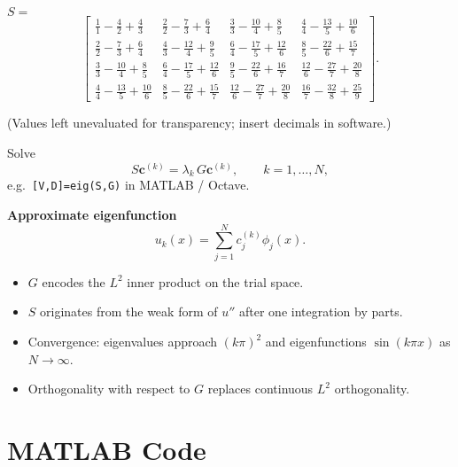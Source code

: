 \documentclass{article}
\begin{document}
$S=$
\[
\begin{bmatrix}
\frac{1}{1}-\frac{4}{2}+\frac{4}{3} & 
\frac{2}{2}-\frac{7}{3}+\frac{6}{4} & 
\frac{3}{3}-\frac{10}{4}+\frac{8}{5} & 
\frac{4}{4}-\frac{13}{5}+\frac{10}{6}\\
\frac{2}{2}-\frac{7}{3}+\frac{6}{4} &
\frac{4}{3}-\frac{12}{4}+\frac{9}{5} &
\frac{6}{4}-\frac{17}{5}+\frac{12}{6}&
\frac{8}{5}-\frac{22}{6}+\frac{15}{7}\\
\frac{3}{3}-\frac{10}{4}+\frac{8}{5}&
\frac{6}{4}-\frac{17}{5}+\frac{12}{6}&
\frac{9}{5}-\frac{22}{6}+\frac{16}{7}&
\frac{12}{6}-\frac{27}{7}+\frac{20}{8}\\
\frac{4}{4}-\frac{13}{5}+\frac{10}{6}&
\frac{8}{5}-\frac{22}{6}+\frac{15}{7}&
\frac{12}{6}-\frac{27}{7}+\frac{20}{8}&
\frac{16}{7}-\frac{32}{8}+\frac{25}{9}
\end{bmatrix}.
\]

(Values left unevaluated for transparency; insert decimals in software.)


Solve 
\[
S\mathbf c^{(k)}=\lambda_k\,G\mathbf c^{(k)},\qquad k=1,\dots ,N,
\]
e.g.\ \verb|[V,D]=eig(S,G)| in MATLAB / Octave.  

\textbf{Approximate eigenfunction}  
\[
u_k(x)=\sum_{j=1}^{N}c^{(k)}_j\phi_j(x).
\]


\begin{itemize}
\item $G$ encodes the $L^2$ inner product on the trial space.  
\item $S$ originates from the weak form of $u''$ after one integration by parts.  
\item Convergence: eigenvalues approach $(k\pi)^2$ and eigenfunctions $\sin(k\pi x)$ as $N\to\infty$.  
\item Orthogonality with respect to $G$ replaces continuous $L^2$ orthogonality.  
\end{itemize}

\section*{MATLAB Code}
\end{document}
